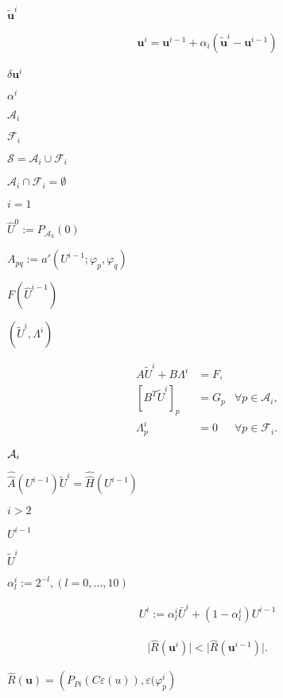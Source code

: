 \documentclass{article}
\begin{document}
$\tilde {\mathbf u}^{i}$
\pagebreak

\begin{align*} {\mathbf u}^{i} = {\mathbf u}^{i-1} + \alpha_i (\tilde {\mathbf u}^{i} - {\mathbf u}^{i-1}) \end{align*}
\pagebreak

$\delta {\mathbf u}^{i}$
\pagebreak

$\alpha^i$
\pagebreak

$\mathcal{A}_i$
\pagebreak

$\mathcal{F}_i$
\pagebreak

$\mathcal{S} = \mathcal{A}_i \cup \mathcal{F}_i$
\pagebreak

$\mathcal{A}_i \cap \mathcal{F}_i = \emptyset$
\pagebreak

$i = 1$
\pagebreak

$\hat U^0 := P_{\mathcal{A}_k}(0)$
\pagebreak

$A_{pq} := a'( U^{i-1};\varphi_p,\varphi_q)$
\pagebreak

$F(\hat U^{i-1})$
\pagebreak

$(\tilde U^i,\Lambda^i)$
\pagebreak

\begin{align*} A\tilde U^i + B\Lambda^i & = F, &\\ \left[B^T\tilde U^i\right]_p & = G_p & \forall p\in\mathcal{A}_i,\\ \Lambda^i_p & = 0 & \forall p\in\mathcal{F}_i. \end{align*}
\pagebreak

${\cal A}_i$
\pagebreak

$\hat {\hat A}(U^{i-1}) \tilde U^i = \hat {\hat H}(U^{i-1})$
\pagebreak

$i>2$
\pagebreak

$U^{i-1}$
\pagebreak

$\tilde U^i$
\pagebreak

$\alpha^i_l:=2^{-l},(l=0,\ldots,10)$
\pagebreak

\begin{gather*}U^i := \alpha^i_l\bar U^i + (1-\alpha^i_l)U^{i-1}\end{gather*}
\pagebreak

\begin{gather*} \vert {\hat R}\left({\mathbf u}^{i}\right) \vert < \vert {\hat R}\left({\mathbf u}^{i-1}\right) \vert. \end{gather*}
\pagebreak

${\hat R}\left({\mathbf u}\right)=\left(P_{Pi}(C\varepsilon(u)),\varepsilon(\varphi^{i}_p\right)$
\pagebreak
\end{document}
